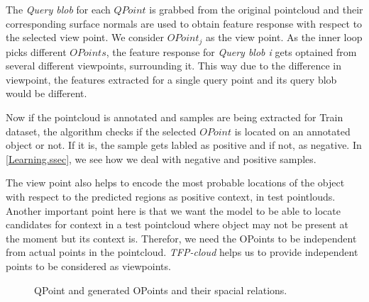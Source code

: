 
The {\it Query blob} for each $QPoint$ is grabbed from the original pointcloud and their corresponding surface normals are used to obtain feature response with respect to the selected view point. We consider $OPoint_j$ as the view point. As the inner loop picks different $OPoints$, the feature response for {\it Query blob i} gets optained from several different viewpoints, surrounding it. This way due to the difference in viewpoint, the features extracted for a single query point and its query blob would be different.


Now if the pointcloud is annotated and samples are being extracted for Train dataset, the algorithm checks if the selected $OPoint$ is located on an annotated object or not. If it is, the sample gets labled as positive and if not, as negative. In \ref{Learning.ssec}, we see how we deal with negative and positive samples.

The view point also helps to encode the most probable locations of the object with respect to the predicted regions as positive context, in test pointlouds. Another important point here is that we want the model to be able to locate candidates for context in a test pointcloud where 
object may not be present at the moment but its context is. Therefor, we need the OPoints to be independent from actual points in the pointcloud.
{\it TFP-cloud} helps us to provide independent points to be considered as viewpoints.




\begin{figure}[t]
  \caption[Feature extract structure]
  {QPoint and generated OPoints and their spacial relations.}
  \label{PointParameters_Diagram.figure}
\end{figure}

